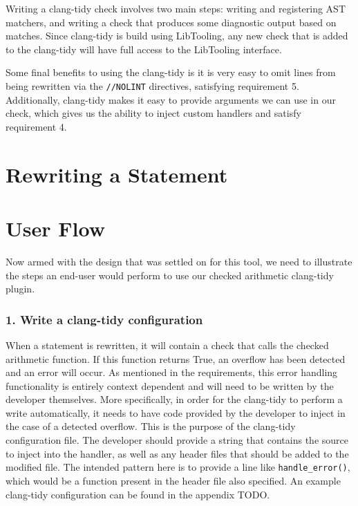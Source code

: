 Writing a clang-tidy check involves two main steps: writing and registering AST matchers, and writing a check that produces some diagnostic output based on matches. Since clang-tidy is build using LibTooling, any new check that is added to the clang-tidy will have full access to the LibTooling interface.

Some final benefits to using the clang-tidy is it is very easy to omit lines from being rewritten via the \texttt{//NOLINT} directives, satisfying requirement 5. Additionally, clang-tidy makes it easy to provide arguments we can use in our check, which gives us the ability to inject custom handlers and satisfy requirement 4.

\section{Rewriting a Statement}

\section{User Flow}

Now armed with the design that was settled on for this tool, we need to illustrate the steps an end-user would perform to use our checked arithmetic clang-tidy plugin.

\subsubsection{1. Write a clang-tidy configuration}

When a statement is rewritten, it will contain a check that calls the checked arithmetic function. If this function returns True, an overflow has been detected and an error will occur. As mentioned in the requirements, this error handling functionality is entirely context dependent and will need to be written by the developer themselves. More specifically, in order for the clang-tidy to perform a write automatically, it needs to have code provided by the developer to inject in the case of a detected overflow. This is the purpose of the clang-tidy configuration file. The developer should provide a string that contains the source to inject into the handler, as well as any header files that should be added to the modified file. The intended pattern here is to provide a line like \texttt{handle\_error()}, which would be a function present in the header file also specified. An example clang-tidy configuration can be found in the appendix TODO.

